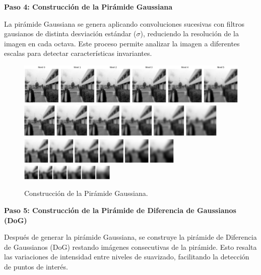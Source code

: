 \documentclass[a4paper]{article}
\begin{document}
\textbf{Paso 4: Construcción de la Pirámide Gaussiana}
\par\vspace{0.5cm}

La pirámide Gaussiana se genera aplicando convoluciones sucesivas con filtros gausianos de distinta desviación estándar (\(\sigma\)), reduciendo la resolución de la imagen en cada octava. Este proceso permite analizar la imagen a diferentes escalas para detectar características invariantes.

\begin{figure}[H]
    \centering
    \includegraphics[width=1.1\textwidth]{images/sift_paso_3.1.png}
    \includegraphics[width=0.9\textwidth]{images/sift_paso_3.2.png}
    \includegraphics[width=0.7\textwidth]{images/sift_paso_3.3.png}
    \includegraphics[width=0.4\textwidth]{images/sift_paso_3.4.png}
    \caption{Construcción de la Pirámide Gaussiana.}
\end{figure}

\textbf{Paso 5: Construcción de la Pirámide de Diferencia de Gaussianos (DoG)}

Después de generar la pirámide Gaussiana, se construye la pirámide de Diferencia de Gaussianos (DoG) restando imágenes consecutivas de la pirámide. Esto resalta las variaciones de intensidad entre niveles de suavizado, facilitando la detección de puntos de interés.
\end{document}

